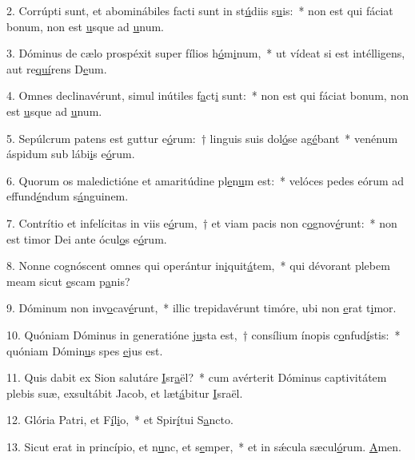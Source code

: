 2. Corrúpti sunt, et abominábiles facti sunt in st\uline{ú}diis s\uline{u}is:~* non est qui fáciat bonum, non est \uline{u}sque ad \uline{u}num.\par 
3. Dóminus de cælo prospéxit super fílios h\uline{ó}m\uline{i}num,~* ut vídeat si est intélligens, aut re\uline{quí}rens D\uline{e}um.\par 
4. Omnes declinavérunt, simul inútiles f\uline{a}ct\uline{i} sunt:~* non est qui fáciat bonum, non est \uline{u}sque ad \uline{u}num.\par 
5. Sepúlcrum patens est guttur e\uline{ó}rum:~† linguis suis dol\uline{ó}se ag\uline{é}bant~* venénum áspidum sub lábi\uline{i}s e\uline{ó}rum.\par 
6. Quorum os maledictióne et amaritúdine pl\uline{e}n\uline{u}m est:~* velóces pedes eórum ad effund\uline{é}ndum s\uline{á}nguinem.\par 
7. Contrítio et infelícitas in viis e\uline{ó}rum,~† et viam pacis non c\uline{o}gnov\uline{é}runt:~* non est timor Dei ante ócul\uline{o}s e\uline{ó}rum.\par 
8. Nonne cognóscent omnes qui operántur in\uline{i}quit\uline{á}tem,~* qui dévorant plebem meam sicut \uline{e}scam p\uline{a}nis?\par 
9. Dóminum non inv\uline{o}cav\uline{é}runt,~* illic trepidavérunt timóre, ubi non \uline{e}rat t\uline{i}mor.\par 
10. Quóniam Dóminus in generatióne \uline{ju}sta est,~† consílium ínopis c\uline{o}nfud\uline{í}stis:~* quóniam Dómin\uline{u}s spes \uline{e}jus est.\par 
11. Quis dabit ex Sion salutáre \uline{I}sr\uline{a}ël?~* cum avérterit Dóminus captivitátem plebis suæ, exsultábit Jacob, et læt\uline{á}bitur \uline{I}sraël.\par 
12. Glória Patri, et F\uline{í}l\uline{i}o,~* et Spir\uline{í}tui S\uline{a}ncto.\par 
13. Sicut erat in princípio, et n\uline{u}nc, et s\uline{e}mper,~* et in sǽcula sæcul\uline{ó}rum. \uline{A}men.\par 
